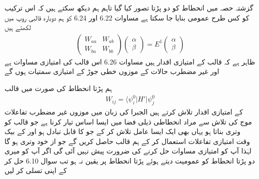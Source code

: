 
گزشتہ حصہ میں انحطاط کو دو پڑتا تصور کیا گیا تاہم ہم دیکھ سکتے ہیں کہ اس ترکیب کو کس طرح عمومی بنایا جا سکتا ہے مساوات 6.22 اور 6.24 کو ہم دوبارہ  قالبی  روپ میں لکھتے ہیں 
\begin{align}
\begin{pmatrix} 
W_{aa} & W_{ab} \\
W_{ba} & W_{bb}
\end{pmatrix}
\begin{pmatrix}
\alpha \\
\beta
\end{pmatrix}
= E^1
\begin{pmatrix}
\alpha \\
\beta
\end{pmatrix}
\end{align}
ظاہر ہے کہ   قالب کے امتیازی اقدار ہیں مساوات 6.26 اس قالب کی امتیازی مساوات ہے  اور غیر مضطرب حالات کے موزوں خطی جوڑ  کے امتیازی سمتیات ہوں گے

 ہم  پڑتا انحطاط کی صورت میں   قالب
\begin{align}
W_{i j} = \langle \psi_i^0 | H' | \psi_j^0
\end{align}
کے امتیازی اقدار تلاش کرتے ہیں الجبرا کی زبان میں موزوں غیر مضطرب تفاعلات موج کی تلاش سے مراد انحطاطی  ذيلی فضا میں ایسا اساس تیار کرنا ہے جو قالب  کو  وتری بناتا ہو یہاں بھی ایک ایسا عامل  تلاش کر کے جو  کا قابل تبادل ہو  اور  کے بیک وقت امتیازی تفاعلات استعمال کر کے ہم قالب  حاصل کریں گے جو از خود وتری ہو گا لہٰذا  آپ  کو امتیازی مساوات حل کرنے کی ضرورت پیش نہیں آئی گی اگر آپ کو میری دو پڑتا انحطاط کو عمومیت دیتے ہوئے  پڑتا انحطاط پر یقین نہ ہو تب سوال 6.10 حل کر کے  اپنی تسلی کر لیں 

